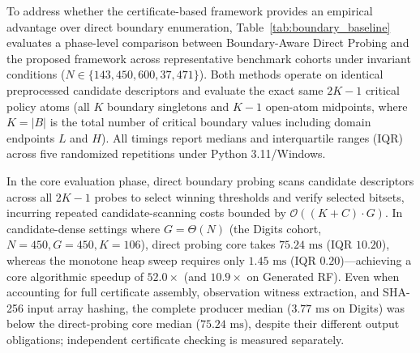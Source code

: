 \documentclass[11pt,a4paper]{article}
\begin{document}
To address whether the certificate-based framework provides an empirical advantage over direct boundary enumeration, Table~\ref{tab:boundary_baseline} evaluates a phase-level comparison between Boundary-Aware Direct Probing and the proposed framework across representative benchmark cohorts under invariant conditions ($N \in \{143, 450, 600, 37{,}471\}$). Both methods operate on identical preprocessed candidate descriptors and evaluate the exact same $2K-1$ critical policy atoms (all $K$ boundary singletons and $K-1$ open-atom midpoints, where $K = |B|$ is the total number of critical boundary values including domain endpoints $L$ and $H$). All timings report medians and interquartile ranges (IQR) across five randomized repetitions under Python 3.11/Windows.

In the core evaluation phase, direct boundary probing scans candidate descriptors across all $2K-1$ probes to select winning thresholds and verify selected bitsets, incurring repeated candidate-scanning costs bounded by $\mathcal{O}((K+C) \cdot G)$. In candidate-dense settings where $G = \Theta(N)$ (the Digits cohort, $N=450, G=450, K=106$), direct probing core takes $75.24\text{ ms}$ (IQR $10.20$), whereas the monotone heap sweep requires only $1.45\text{ ms}$ (IQR $0.20$)---achieving a core algorithmic speedup of $52.0\times$ (and $10.9\times$ on Generated RF). Even when accounting for full certificate assembly, observation witness extraction, and SHA-256 input array hashing, the complete producer median ($3.77\text{ ms}$ on Digits) was below the direct-probing core median ($75.24\text{ ms}$), despite their different output obligations; independent certificate checking is measured separately.
\end{document}
